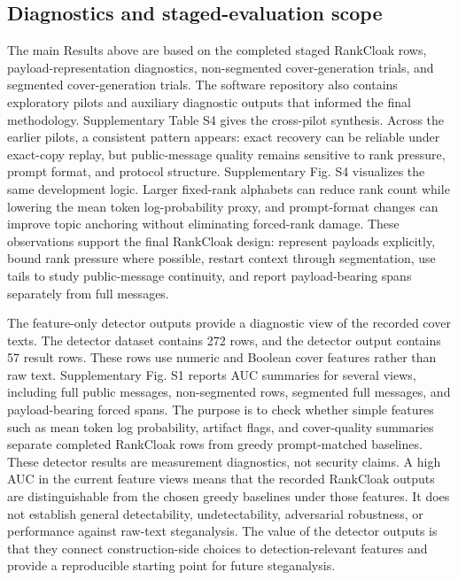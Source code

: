 \documentclass[fleqn,10pt]{wlscirep}
\begin{document}
\subsection*{Diagnostics and staged-evaluation scope}

The main Results above are based on the completed staged RankCloak rows, payload-representation diagnostics, non-segmented cover-generation trials, and segmented cover-generation trials. The software repository also contains exploratory pilots and auxiliary diagnostic outputs that informed the final methodology. 
Supplementary Table S4 gives the cross-pilot synthesis. Across the earlier pilots, a consistent pattern appears: exact recovery can be reliable under exact-copy replay, but public-message quality remains sensitive to rank pressure, prompt format, and protocol structure. Supplementary Fig. S4 visualizes the same development logic. Larger fixed-rank alphabets can reduce rank count while lowering the mean token log-probability proxy, and prompt-format changes can improve topic anchoring without eliminating forced-rank damage. These observations support the final RankCloak design: represent payloads explicitly, bound rank pressure where possible, restart context through segmentation, use tails to study public-message continuity, and report payload-bearing spans separately from full messages.

The feature-only detector outputs provide a diagnostic view of the recorded cover texts. The detector dataset contains 272 rows, and the detector output contains 57 result rows. These rows use numeric and Boolean cover features rather than raw text. Supplementary Fig. S1 reports AUC summaries for several views, including full public messages, non-segmented rows, segmented full messages, and payload-bearing forced spans. The purpose is to check whether simple features such as mean token log probability, artifact flags, and cover-quality summaries separate completed RankCloak rows from greedy prompt-matched baselines.
These detector results are measurement diagnostics, not security claims. A high AUC in the current feature views means that the recorded RankCloak outputs are distinguishable from the chosen greedy baselines under those features. It does not establish general detectability, undetectability, adversarial robustness, or performance against raw-text steganalysis. The value of the detector outputs is that they connect construction-side choices to detection-relevant features and provide a reproducible starting point for future steganalysis.
\end{document}

